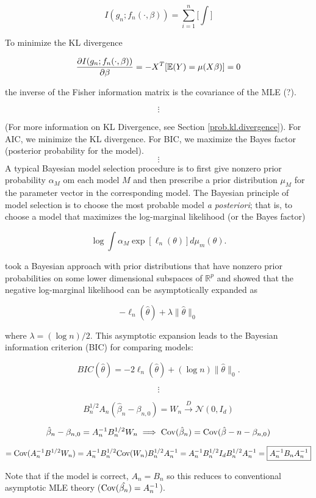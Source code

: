 \[
I(g_n; f_n(\cdot, \beta)) = \sum_{i=1}^n \bigg[ \int \bigg]
\]

To minimize the KL divergence

\[
\pderiv{I(g_n; f_n(\cdot, \beta))}{\beta} = - X^T [ \E(Y) = \mu(X \beta)] = 0
\]

the inverse of the Fisher information matrix is the covariance of the MLE (?).

\[
\vdots
\]

(For more information on KL Divergence, see Section \ref{prob.kl.divergence}). For AIC, we minimize the KL divergence. For BIC, we maximize the Bayes factor (posterior probability for the model).
\[
\vdots
\]
A typical Bayesian model selection procedure is to first give nonzero prior probability \(\alpha_M\) om each model \(M\) and then prescribe a prior distribution \(\mu_M\) for the parameter vector in the corresponding model. The Bayesian principle of model selection is to choose the most probable model \textit{a posteriori}; that is, to choose a model that maximizes the log-marginal likelihood (or the Bayes factor)

\[
\log \int \alpha_M \exp [ \ell_n (\theta)] d \mu_m(\theta).
\]

\citet{Schwarz1978} took a Bayesian approach with prior distributions that have nonzero prior probabilities on some lower dimensional subspaces of \(\mathbb{R}^p\) and showed that the negative log-marginal likelihood can be asymptotically expanded as 

\[
-\ell_n(\hat{\theta}) + \lambda \lVert \hat{\theta} \rVert_0
\]

where \(\lambda = (\log n)/2\). This asymptotic expansion leads to the Bayesian information criterion (BIC) for comparing models:

\[
BIC(\hat{\theta}) = -2 \ell_n (\hat{\theta}) + (\log n) \lVert \hat{\theta} \rVert_0.
\]

\[
\vdots
\]


\[
B_n^{1/2} A_n(\hat{\beta}_n - \beta_{n,0} ) = W_n \xrightarrow{D} \mathcal{N}(0, I_d)
\]

\[
\hat{\beta}_n - \beta_{n,0} = A_n^{-1} B_n^{1/2} W_n \implies \Cov(\hat{\beta}_n) = \Cov(\hat{\beta}-n - \beta_{n,0})
\]

\[ 
= \Cov(A_n^{-1} B^{1/2} W_n) = A_n^{-1}B_n^{1/2} \Cov(W_n) B_n^{1/2} A_n^{-1} = A_n^{-1}B_n^{1/2} I_d B_n^{1/2} A_n^{-1} = \boxed{A_n^{-1} B_n A_n^{-1}}
\]

Note that if the model is correct, \(A_n = B_n\) so this reduces to conventional asymptotic MLE theory (\(\Cov(\hat{\beta_n}) = A_n^{-1}\)).

